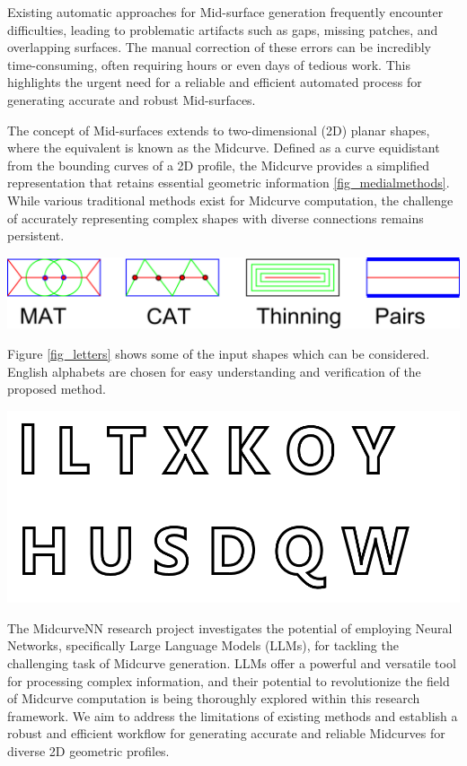 \documentclass[conference]{IEEEtran}
\begin{document}
Existing automatic approaches for Mid-surface generation frequently encounter difficulties, leading to problematic artifacts such as gaps, missing patches, and overlapping surfaces. The manual correction of these errors can be incredibly time-consuming, often requiring hours or even days of tedious work. This highlights the urgent need for a reliable and efficient automated process for generating accurate and robust Mid-surfaces.

The concept of Mid-surfaces extends to two-dimensional (2D) planar shapes, where the equivalent is known as the Midcurve. Defined as a curve equidistant from the bounding curves of a 2D profile, the Midcurve provides a simplified representation that retains essential geometric information \ref{fig_medialmethods}. While various traditional methods exist for Midcurve computation, the challenge of accurately representing complex shapes with diverse connections remains persistent.

    \begin{center}
	\includegraphics[width=\linewidth]{images/MedialMethodsOnlyShort}
	 \cite{midcurvenn2022}
	\label{fig_medialmethods}
    \end{center}
	
Figure \ref{fig_letters} shows some of the input shapes which can be considered. English alphabets are chosen for easy understanding and verification of the proposed method.

     \begin{center}
	\includegraphics[width=0.8\linewidth]{images/Letters}
	 \cite{midcurvenn2023}
	\label{fig_letters}
    \end{center}
	
The MidcurveNN research project investigates the potential of employing Neural Networks, specifically Large Language Models (LLMs), for tackling the challenging task of Midcurve generation. LLMs offer a powerful and versatile tool for processing complex information, and their potential to revolutionize the field of Midcurve computation is being thoroughly explored within this research framework. We aim to address the limitations of existing methods and establish a robust and efficient workflow for generating accurate and reliable Midcurves for diverse 2D geometric profiles.
\end{document}
